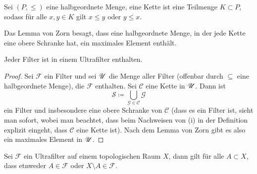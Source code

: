 \begin{defn}
    Sei $(P,\le)$ eine halbgeordnete Menge, eine Kette ist eine Teilmenge $K\subset P$, sodass für alle $x,y\in K$ gilt $x\le y$ oder $y\le x$.
\end{defn}
Das Lemma von Zorn besagt, dass eine halbgeordnete Menge, in der jede Kette eine obere Schranke hat, ein maximales Element enthält.
\begin{lemma}Jeder Filter ist in einem Ultrafilter enthalten.
\end{lemma}
\begin{proof}
    Sei $\mathcal{F}$ ein Filter und sei $\mathscr{U}$ die Menge aller Filter (offenbar durch $\subseteq$ eine halbgeordnete Menge), die $\mathcal{F}$ enthalten. Sei $\mathcal{C}$ eine Kette in $\mathscr{U}$. Dann ist 
    \[
    \mathcal{S} \coloneqq \bigcup_{\mathcal{G}\in \mathcal{C}} \mathcal{G}     
    \] 
    ein Filter und insbesondere eine obere Schranke von $\mathcal{C}$ (dass es ein Filter ist, sieht man sofort, wobei man beachtet, dass beim Nachweisen von (i) in der Definition explizit eingeht, dass $\mathcal{C}$ eine Kette ist). Nach dem Lemma von 
    Zorn gibt es also ein maximales Element in $\mathscr{U}$.
\end{proof}
\begin{lemma}
    Sei $\mathcal{F}$ ein Ultrafilter auf einem topologischen Raum $X$, dann gilt für alle $A\subset X$, dass etnweder $A\in \mathcal{F}$ oder $X\setminus A\in \mathcal{F}$.
\end{lemma}
